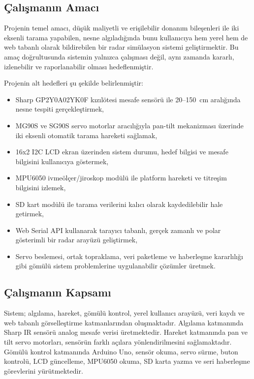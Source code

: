\subsection{Çalışmanın Amacı}
Projenin temel amacı, düşük maliyetli ve erişilebilir donanım bileşenleri ile iki eksenli tarama yapabilen, nesne algıladığında bunu kullanıcıya hem yerel hem de web tabanlı olarak bildirebilen bir radar simülasyon sistemi geliştirmektir. Bu amaç doğrultusunda sistemin yalnızca çalışması değil, aynı zamanda kararlı, izlenebilir ve raporlanabilir olması hedeflenmiştir.

Projenin alt hedefleri şu şekilde belirlenmiştir:
\begin{itemize}
    \item Sharp GP2Y0A02YK0F \cite{sharp_datasheet} kızılötesi mesafe sensörü ile 20--150~cm aralığında nesne tespiti gerçekleştirmek,
    \item MG90S ve SG90S servo motorlar aracılığıyla pan-tilt mekanizması üzerinde iki eksenli otomatik tarama hareketi sağlamak,
    \item 16x2 I2C LCD ekran üzerinden sistem durumu, hedef bilgisi ve mesafe bilgisini kullanıcıya göstermek,
    \item MPU6050 \cite{mpu6050_datasheet} ivmeölçer/jiroskop modülü ile platform hareketi ve titreşim bilgisini izlemek,
    \item SD kart modülü ile tarama verilerini kalıcı olarak kaydedilebilir hale getirmek,
    \item Web Serial API kullanarak tarayıcı tabanlı, gerçek zamanlı ve polar gösterimli bir radar arayüzü geliştirmek,
    \item Servo beslemesi, ortak topraklama, veri paketleme ve haberleşme kararlılığı gibi gömülü sistem problemlerine uygulanabilir çözümler üretmek.
\end{itemize}

\subsection{Çalışmanın Kapsamı}
Sistem; algılama, hareket, gömülü kontrol, yerel kullanıcı arayüzü, veri kaydı ve web tabanlı görselleştirme katmanlarından oluşmaktadır. Algılama katmanında Sharp IR sensörü analog mesafe verisi üretmektedir. Hareket katmanında pan ve tilt servo motorları, sensörün farklı açılara yönlendirilmesini sağlamaktadır. Gömülü kontrol katmanında Arduino Uno, sensör okuma, servo sürme, buton kontrolü, LCD güncelleme, MPU6050 okuma, SD karta yazma ve seri haberleşme görevlerini yürütmektedir.

